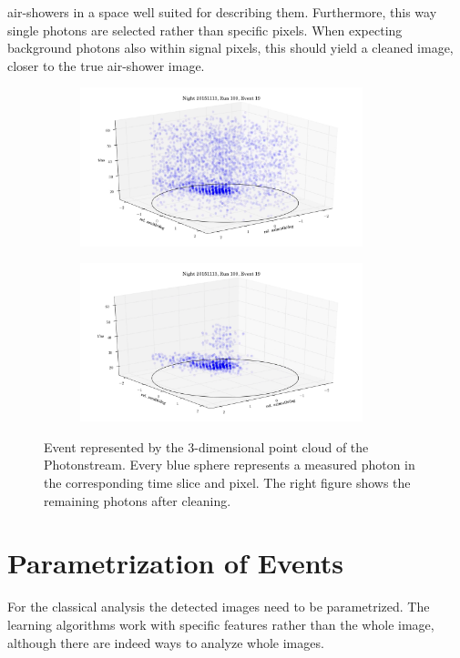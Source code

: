 air-showers in a space well suited for describing them. Furthermore, this way
single photons are selected rather than specific pixels. When expecting
background photons also within signal pixels, this should yield a cleaned image,
closer to the true air-shower image.
%
\begin{figure}
  \begin{subfigure}{\textwidth}
    \centering
    \includegraphics[width=0.9\textwidth]{Plots/event2.png}
  \end{subfigure}
  \begin{subfigure}{\textwidth}
    \centering
    \includegraphics[width=0.9\textwidth]{Plots/event1.png}
  \end{subfigure}
  \caption{Event represented by the 3-dimensional point cloud of the Photonstream. Every blue sphere represents a measured photon in the corresponding time slice and pixel. The right figure shows the remaining photons after cleaning.}
  \label{fig:event}
\end{figure}
%

\section{Parametrization of Events}
\label{sec:params}
%
For the classical analysis the detected images need to be parametrized. The
learning algorithms work with specific features rather than the whole image,
although there are indeed ways to analyze whole images.

